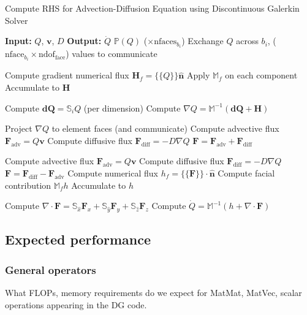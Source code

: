 \documentclass[11pt]{article}
\renewcommand{\vec}[1]{\bm{#1}}
\begin{document}
\begin{algorithm}
\caption{Compute RHS for Advection-Diffusion Equation using Discontinuous Galerkin Solver}
\begin{algorithmic}[1]
\State \textbf{Input:} $Q$, $\vec{v}$, $D$
\State \textbf{Output:} $\dot{Q}$
\State $\mathbb{P}(Q)$ ($\times \text{nfaces}_{b_i}$)
\State Exchange $Q$ across $b_i$, ($\text{nface}_{b_i} \times \text{ndof}_\text{face}$) values to communicate
\EndIf
\EndFor

  \State Compute gradient numerical flux $\mathbf{H}_f = \{\{Q\}\}\hat{\mathbf{n}}$
  \State Apply $\mathbb{M}_f$ on each component
  \State Accumulate to $\mathbf{H}$
\EndFor

\State Compute $\vec{dQ} = \mathbb{S}_i Q$ (per dimension)
\State Compute $\nabla{Q} = \mathbb{M}^{-1}(\vec{dQ} + \mathbf{H})$

\State Project $\nabla{Q}$ to element faces (and communicate)
\State Compute advective flux $\mathbf{F}_\text{adv} = Q\vec{v}$
\State Compute diffusive flux $\mathbf{F}_\text{diff} = -D\nabla{Q}$
\State $\mathbf{F} = \mathbf{F}_\text{adv} + \mathbf{F}_\text{diff}$

  \State Compute advective flux $\mathbf{F}_\text{adv} = Q\vec{v}$
  \State Compute diffusive flux $\mathbf{F}_\text{diff} = -D\nabla{Q}$
  \State $\mathbf{F} = \mathbf{F}_\text{diff} - \mathbf{F}_\text{adv}$
  \State Compute numerical flux $h_f=\{\{\mathbf{F}\}\} \cdot \hat{\mathbf{n}}$
  \State Compute facial contribution $\mathbb{M}_f h$
  \State Accumulate to $h$
\EndFor

\State Compute $\nabla \cdot \mathbf{F} = \mathbb{S}_{\hat{x}}\mathbf{F}_x + \mathbb{S}_{\hat{y}}\mathbf{F}_y + \mathbb{S}_{\hat{z}}\mathbf{F}_z$
\State Compute $\dot{Q} = \mathbb{M}^{-1}(h + \nabla \cdot \mathbf{F})$
\end{algorithmic}
\end{algorithm}

\subsection{Expected performance}
\subsubsection{General operators}
What FLOPs, memory requirements do we expect for MatMat, MatVec, scalar operations appearing in the DG code.
\end{document}
